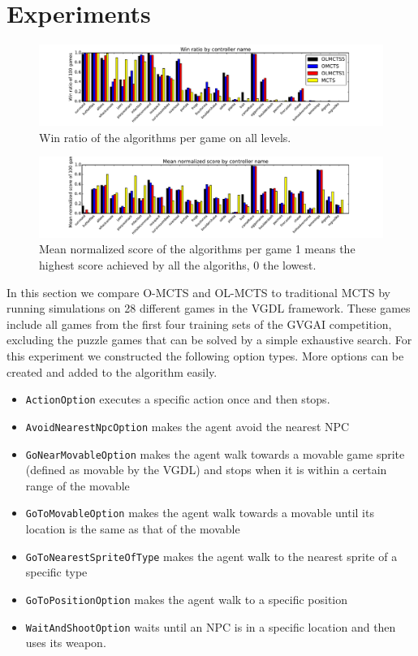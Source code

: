 \section{Experiments}
\label{sec:experiments}
\begin{figure}
	\centering
	\includegraphics[width=\textwidth]{includes/wins}
	\vspace{-.8cm}
	\caption{Win ratio of the algorithms per game on all levels.}
	\label{fig:wins}
\end{figure}

\begin{figure}
	\centering
	\includegraphics[width=\textwidth]{includes/scores}
	\vspace{-.8cm}
	\caption{Mean normalized score of the algorithms per game 1 means the
	highest score achieved by all the algoriths, 0 the lowest.}
	\label{fig:scores}
\end{figure}


In this section we compare O-MCTS and OL-MCTS to traditional MCTS by running
simulations on 28 different games in the VGDL framework. These games include all
games from the first four training sets of the GVGAI competition, excluding the
puzzle games that can be solved by a simple exhaustive search. For this
experiment we constructed the following option types. More options can be
created and added to the algorithm easily.

\begin{itemize}[noitemsep]
	\item \texttt{ActionOption} executes a specific action once and then
		stops.
	\item \texttt{AvoidNearestNpcOption} makes the agent avoid the nearest NPC
	\item \texttt{GoNearMovableOption} makes the agent walk towards a
		movable game sprite (defined as movable by the VGDL) and stops when it
		is within a certain range of the movable
	\item \texttt{GoToMovableOption} makes the agent walk towards a
		movable until its location is the same as that of the movable
	\item \texttt{GoToNearestSpriteOfType} makes the agent walk to the nearest sprite of
		a specific type
	\item \texttt{GoToPositionOption} makes the agent walk to a specific position
	\item \texttt{WaitAndShootOption} waits until an NPC is in a specific location and
		then uses its weapon.
\end{itemize}

